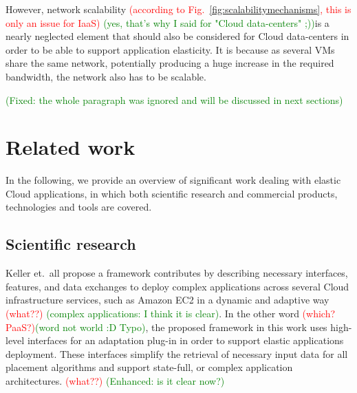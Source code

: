 \documentclass{sig-alternate}
\newcommand\todo[1]{\textcolor{red}{(#1)}}
\newcommand\done[1]{\textcolor{green}{(#1)}}
\begin{document}
However, network scalability \todo{according to  Fig.~\ref{fig:scalabilitymechanisms}, this is only an issue for IaaS} \done{yes, that's why I said for "Cloud data-centers" ;)}is a nearly neglected element that should also be considered \cite{wu2009unified} for Cloud data-centers in order to be able to support application elasticity. It is because as several VMs share the same network, potentially producing a huge increase in the required bandwidth, the network also has to be scalable. 

\done{Fixed: the whole paragraph was ignored and will be discussed in next sections}

\begin{figure*}
\centering
{}
\caption{Possible mechanisms to support elasticity on Cloud IaaS and PaaS \cite{vaquero2011dynamically}.}
\label{fig:scalabilitymechanisms}
\end{figure*}

\section{Related work}
\label{sec:rw}
In the following, we provide an overview of significant work dealing with elastic Cloud applications, in which both scientific research and commercial products, technologies and tools are covered.

\subsection{Scientific research}
\label{sec:scientific}
Keller et.~all \cite{keller2013topology} propose a framework contributes by describing necessary interfaces, features, and data exchanges to deploy complex applications across several Cloud infrastructure services, such as Amazon EC2 in a dynamic and adaptive way \todo{what??} \done{complex applications: I think it is clear}. In the other word \todo{which? PaaS?}\done{word not world :D Typo}, the proposed framework in this work uses high-level interfaces for an adaptation plug-in in order to support elastic applications deployment. These interfaces simplify the retrieval of necessary input data for all placement algorithms and support state-full, or complex application architectures. \todo{what??} \done{Enhanced: is it clear now?}
\end{document}
